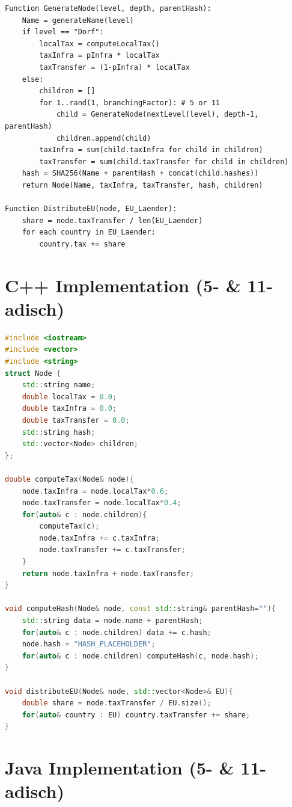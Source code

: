 \documentclass[a4paper,12pt]{article}
\begin{document}
\begin{verbatim}
Function GenerateNode(level, depth, parentHash):
    Name = generateName(level)
    if level == "Dorf":
        localTax = computeLocalTax()
        taxInfra = pInfra * localTax
        taxTransfer = (1-pInfra) * localTax
    else:
        children = []
        for 1..rand(1, branchingFactor): # 5 or 11
            child = GenerateNode(nextLevel(level), depth-1, parentHash)
            children.append(child)
        taxInfra = sum(child.taxInfra for child in children)
        taxTransfer = sum(child.taxTransfer for child in children)
    hash = SHA256(Name + parentHash + concat(child.hashes))
    return Node(Name, taxInfra, taxTransfer, hash, children)

Function DistributeEU(node, EU_Laender):
    share = node.taxTransfer / len(EU_Laender)
    for each country in EU_Laender:
        country.tax += share
\end{verbatim}

\section{C++ Implementation (5- & 11-adisch)}

\begin{lstlisting}[language=C++]
#include <iostream>
#include <vector>
#include <string>
struct Node {
    std::string name;
    double localTax = 0.0;
    double taxInfra = 0.0;
    double taxTransfer = 0.0;
    std::string hash;
    std::vector<Node> children;
};

double computeTax(Node& node){
    node.taxInfra = node.localTax*0.6;
    node.taxTransfer = node.localTax*0.4;
    for(auto& c : node.children){
        computeTax(c);
        node.taxInfra += c.taxInfra;
        node.taxTransfer += c.taxTransfer;
    }
    return node.taxInfra + node.taxTransfer;
}

void computeHash(Node& node, const std::string& parentHash=""){
    std::string data = node.name + parentHash;
    for(auto& c : node.children) data += c.hash;
    node.hash = "HASH_PLACEHOLDER";
    for(auto& c : node.children) computeHash(c, node.hash);
}

void distributeEU(Node& node, std::vector<Node>& EU){
    double share = node.taxTransfer / EU.size();
    for(auto& country : EU) country.taxTransfer += share;
}
\end{lstlisting}

\section{Java Implementation (5- & 11-adisch)}
\end{document}
